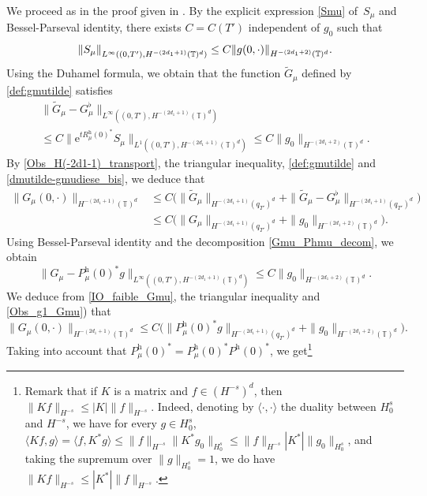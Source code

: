 \documentclass[10pt]{amsart}
\theoremstyle{plain}
\theoremstyle{definition}
\theoremstyle{remark}
\newcommand{\norme}[1]{\left\lVert#1\right\rVert}
\newcommand{\set}{\mathbb}
\newcommand{\T}{\set{T}}
\newcommand{\h}{{\mathrm h}}
\newcommand{\eu}{\mathrm e}
\let\originalleft\left
\let\originalright\right
\renewcommand{\left}{\mathopen{}\mathclose\bgroup\originalleft}
\renewcommand{\right}{\aftergroup\egroup\originalright}
\begin{document}
We proceed as in the proof given in .
By the explicit expression \eqref{Smu} of~$S_\mu$ and Bessel-Parseval identity, there exists $C=C(T')$ independent of $g_0$ such that
\begin{equation}
\label{defsourcecompBis}
\norme{S_\mu}_{L^\infty((0,T'),H^{-(2d_1+1)}(\T)^d)} \leq C \norme{ g(0,\cdot)}_{H^{-(2d_1+2)}(\T)^d}.
\end{equation}
Using the Duhamel formula, we obtain that the function $\widetilde{G}_\mu$ defined by \eqref{def:gmutilde} satisfies
\begin{multline}
\| \widetilde{G}_\mu - G_\mu^\flat \|_{L^\infty((0,T'),H^{-(2d_1+1)}(\T)^d)}\\
\leq C \| \eu^{t R_{\mu}^{\h}(0)^*} S_\mu \|_{L^1((0,T'),H^{-(2d_1+1)}(\T)^d)} \leq C
\| g_0 \|_{H^{-(2d_1+2)}(\T)^d}.
\label{dmutilde-gmudiese_bis}
\end{multline}
By \eqref{Obs_H(-2d1-1)_transport}, the triangular inequality, \eqref{def:gmutilde} and \eqref{dmutilde-gmudiese_bis}, we deduce that
\begin{equation} \label{IO_faible_Gmu}
\begin{aligned}
\| G_\mu(0,\cdot) \|_{H^{-(2d_1+1)}(\T)^d}
& \leq C \bigl(\| \widetilde{G}_\mu \|_{H^{-(2d_1+1)}(q_{T'})^d} + \| \widetilde{G}_\mu - G_\mu^\flat \|_{H^{-(2d_1+1)}(q_{T'})^d} \bigr) \\
& \leq C \bigl(\|G_\mu\|_{H^{-(2d_1+1)}(q_{T'})^d}+ \| g_0 \|_{H^{-(2d_1+2)}(\T)^d}
\bigr).
\end{aligned}
\end{equation}
Using Bessel-Parseval identity and the decomposition \eqref{Gmu_Phmu_decom}, we obtain
\begin{equation} \label{Obs_g1_Gmu}
\|G_{\mu} -P^\h_\mu(0)^* g \|_{L^\infty((0,T'),H^{-(2d_1+1)}(\T)^d)} \leq C \| g_0\|_{H^{-(2d_1+2)}(\T)^d}.
\end{equation}
We deduce from \eqref{IO_faible_Gmu}, the triangular inequality and \eqref{Obs_g1_Gmu}) that
\[
\| G_\mu(0,\cdot) \|_{H^{-(2d_1+1)}(\T)^d} \leq C \bigl(
\| P^\h_\mu(0)^* g \|_{H^{-(2d_1+1)}(q_{T'})^d} + \| g_0\|_{H^{-(2d_1+2)}(\T)^d} \bigr).
\]
Taking into account that $P^\h_\mu(0)^*=P^\h_\mu(0)^* P^\h(0)^*$, we get\footnote{Remark that if $K$ is a matrix and $f\in (H^{-s})^d$, then $\|Kf\|_{H^{-s}}\leq |K|\|f\|_{H^{-s}}$. Indeed, denoting by $\langle\cdot,\cdot\rangle$ the duality between $H^s_0$ and $H^{-s}$, we have for every $g\in H^{s}_0$, $\langle Kf,g\rangle = \langle f, K^*g\rangle\leq \|f\|_{H^{-s}} \|K^* g_0\|_{H^s_0}\leq\|f\|_{H^{-s}}|K^*| \| g_0\|_{H^s_0} $, and taking the supremum over $\|g\|_{H^s_0} = 1$, we do have $\|Kf\|_{H^{-s}}\leq |K^*|\|f\|_{H^{-s}}$.}
\end{document}

